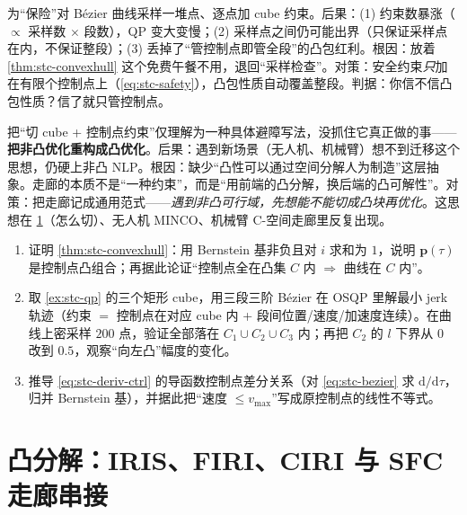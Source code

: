 \begin{pitfall}
为“保险”对 Bézier 曲线采样一堆点、逐点加 cube 约束。后果：(1) 约束数暴涨（$\propto$ 采样数 $\times$ 段数），QP 变大变慢；(2) 采样点之间仍可能出界（只保证采样点在内，不保证整段）；(3) 丢掉了“管控制点即管全段”的凸包红利。根因：放着 \cref{thm:stc-convexhull} 这个免费午餐不用，退回“采样检查”。对策：安全约束\emph{只}加在有限个控制点上（\cref{eq:stc-safety}），凸包性质自动覆盖整段。判据：你信不信凸包性质？信了就只管控制点。
\end{pitfall}

\begin{pitfall}
把“切 cube + 控制点约束”仅理解为一种具体避障写法，没抓住它真正做的事——\textbf{把非凸优化重构成凸优化}。后果：遇到新场景（无人机、机械臂）想不到迁移这个思想，仍硬上非凸 NLP。根因：缺少“凸性可以通过空间分解人为制造”这层抽象。走廊的本质不是“一种约束”，而是“用前端的凸分解，换后端的凸可解性”。对策：把走廊记成通用范式——\emph{遇到非凸可行域，先想能不能切成凸块再优化}。这思想在 \cref{sec:stc-iris}（怎么切）、无人机 MINCO、机械臂 C-空间走廊里反复出现。
\end{pitfall}

\begin{practice}
\begin{enumerate}
  \item 证明 \cref{thm:stc-convexhull}：用 Bernstein 基非负且对 $i$ 求和为 $1$，说明 $\mathbf{p}(\tau)$ 是控制点凸组合；再据此论证“控制点全在凸集 $C$ 内 $\Rightarrow$ 曲线在 $C$ 内”。
  \item 取 \cref{ex:stc-qp} 的三个矩形 cube，用三段三阶 Bézier 在 OSQP 里解最小 jerk 轨迹（约束 $=$ 控制点在对应 cube 内 + 段间位置/速度/加速度连续）。在曲线上密采样 $200$ 点，验证全部落在 $C_1\cup C_2\cup C_3$ 内；再把 $C_2$ 的 $l$ 下界从 $0$ 改到 $0.5$，观察“向左凸”幅度的变化。
  \item 推导 \cref{eq:stc-deriv-ctrl} 的导函数控制点差分关系（对 \cref{eq:stc-bezier} 求 $\mathrm{d}/\mathrm{d}\tau$，归并 Bernstein 基），并据此把“速度 $\le v_{\max}$”写成原控制点的线性不等式。
\end{enumerate}
\end{practice}

\section{凸分解：IRIS、FIRI、CIRI 与 SFC 走廊串接}
\label{sec:stc-iris}

